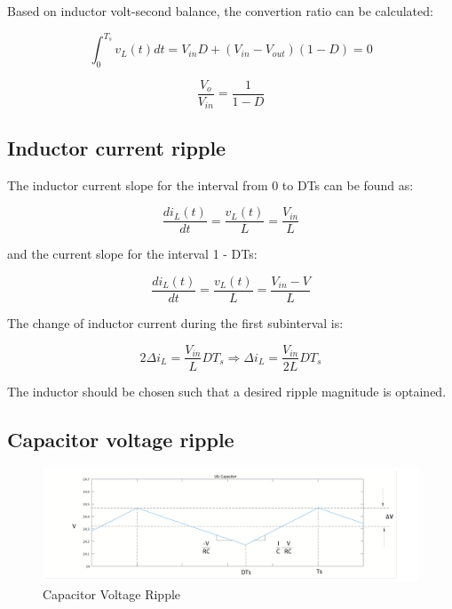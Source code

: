 Based on inductor volt-second balance, the convertion ratio can be calculated:

\begin{equation}
	\int_{0}^{T_s} v_L(t)dt = V_{in}D + (V_{in}-V_{out})(1-D) = 0
	\label{eq:CBC_VISB}
\end{equation}

\begin{equation}
	\frac{V_o}{V_{in}} = \frac{1}{1-D}
	\label{eq:CBC_CR}
\end{equation}

\subsection{Inductor current ripple}\label{sec:SON}

The inductor current slope for the interval from 0 to DTs can be found as:

\begin{equation}
	\frac{di_{L}(t)}{dt} = \frac{v_{L}(t)}{L} = \frac{V_{in}}{L}
	\label{eq:CBC_ICR1}
\end{equation}

and the current slope for the interval 1 - DTs:

\begin{equation}
	\frac{di_{L}(t)}{dt} = \frac{v_{L}(t)}{L} = \frac{V_{in} - V}{L}
	\label{eq:CBC_ICR2}
\end{equation}

The change of inductor current during the first subinterval is:

\begin{equation}
	2\Delta i_L = \frac{V_{in}}{L}DT_s \Rightarrow
  \Delta i_L = \frac{V_{in}}{2L}DT_s
	\label{eq:CBC_ICR3}
\end{equation}

The inductor should be chosen such that a desired ripple magnitude is optained.

\subsection{Capacitor voltage ripple}\label{sec:SON}

\begin{figure}[H]
   \centering
   \includegraphics[width=\textwidth]{figures/aConventionalBoost/CapacitorVoltage.pdf}
    \caption{Capacitor Voltage Ripple}
	\label{fig:CBC_CVR}
\end{figure}

